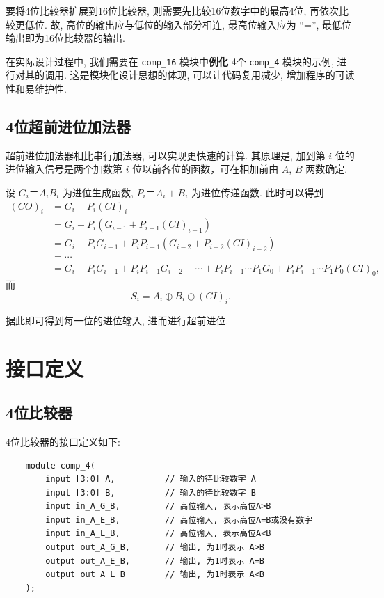 \documentclass{article}
\begin{document}
要将4位比较器扩展到16位比较器, 则需要先比较16位数字中的最高4位, 再依次比较更低位. 故, 高位的输出应与低位的输入部分相连, 最高位输入应为 ``='', 最低位输出即为16位比较器的输出.

在实际设计过程中, 我们需要在 \lstinline|comp_16| 模块中\textbf{例化} 4个 \lstinline|comp_4| 模块的示例, 进行对其的调用. 这是模块化设计思想的体现, 可以让代码复用减少, 增加程序的可读性和易维护性.

\subsection{4位超前进位加法器}

超前进位加法器相比串行加法器, 可以实现更快速的计算. 其原理是, 加到第 \(i\) 位的进位输入信号是两个加数第 \(i\) 位以前各位的函数，可在相加前由 \(A\), \(B\) 两数确定.

设 \(G_i＝A_iB_i\) 为进位生成函数, \(P_i＝A_i + B_i\) 为进位传递函数. 此时可以得到 \begin{align*}
    (CO)_i & = G_i + P_i (CI)_i \\
    & = G_i + P_i (G_{i-1} + P_{i-1} (CI)_{i-1}) \\
    & = G_i + P_i G_{i-1} + P_i P_{i-1} (G_{i-2} + P_{i-2} (CI)_{i-2}) \\
    & = \cdots \\
    & = G_i + P_i G_{i-1} + P_i P_{i-1} G_{i-2} + \cdots + P_i P_{i-1} \cdots P_1 G_0 + P_i P_{i-1} \cdots P_1 P_0 (CI)_0,
\end{align*} 而 \[S_i = A_i \oplus B_i \oplus (CI)_i.\]

据此即可得到每一位的进位输入, 进而进行超前进位.

\section{接口定义}

\subsection{4位比较器}

4位比较器的接口定义如下:
\begin{lstlisting}
    module comp_4(
        input [3:0] A,          // 输入的待比较数字 A
        input [3:0] B,          // 输入的待比较数字 B
        input in_A_G_B,         // 高位输入, 表示高位A>B
        input in_A_E_B,         // 高位输入, 表示高位A=B或没有数字
        input in_A_L_B,         // 高位输入, 表示高位A<B
        output out_A_G_B,       // 输出, 为1时表示 A>B
        output out_A_E_B,       // 输出, 为1时表示 A=B
        output out_A_L_B        // 输出, 为1时表示 A<B
    );
\end{lstlisting}
\end{document}
